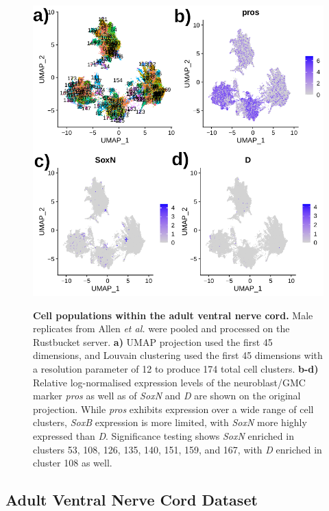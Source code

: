 \documentclass[withindex,glossary]{cam-thesis}
\begin{document}
\setcounter{figure}{20-1}
\begin{figure}[htbp]
\centering
\includegraphics[width=\textwidth]{figs/Fig20 adult brain UMAP and features.png}
\label{fig20}
\caption{\textbf{Cell populations within the adult ventral nerve cord.} Male replicates from Allen \emph{et al.} were pooled and processed on the Rustbucket server. \textbf{a)} UMAP projection used the first 45 dimensions, and Louvain clustering used the first 45 dimensions with a resolution parameter of 12 to produce 174 total cell clusters. \textbf{b-d)} Relative log-normalised expression levels of the neuroblast/GMC marker \emph{pros} as well as of \emph{SoxN} and \emph{D} are shown on the original projection. While \emph{pros} exhibits expression over a wide range of cell clusters, \emph{SoxB} expression is more limited, with \emph{SoxN} more highly expressed than \emph{D}. Significance testing shows \emph{SoxN} enriched in clusters  53, 108, 126, 135, 140, 151, 159, and 167, with \emph{D} enriched in cluster 108 as well.}
\end{figure}

\subsection{Adult Ventral Nerve Cord Dataset}
\end{document}
